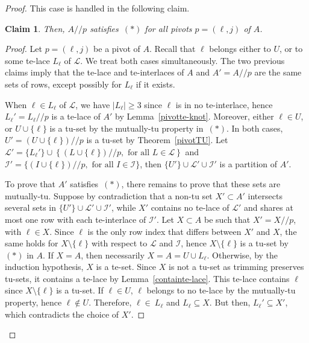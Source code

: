 \documentclass[11pt,a4paper]{amsart}
\renewcommand*{\geq}{\geqslant}
\theoremstyle{plain}
\newtheorem{claimnumb}{Claim}[theorem]{\itshape}{\rmfamily}
\theoremstyle{definition}
\newcommand{\cal}[1]{\mathcal{#1}}
\renewcommand{\cal}[1]{\mathcal{#1}}
\newcommand{\trim}{/\!\!/}
\begin{document}
\begin{proof}
\medskip

This case is handled in the following claim.

\begin{claimnumb}\label{cl1.3}
Then, $A\trim p$ satisfies~$(\ast)$ for all pivots $p=(\ell,j)$ of $A$.
\end{claimnumb}
\begin{proof}


Let $p=(\ell,j)$ be a pivot of $A$.
Recall that $\ell$ belongs either to $U$, or to some te-lace $L_\ell$ of $\cal L$. 
We treat both cases simultaneously.
The two previous claims imply that the te-lace and te-interlaces of $A$ and $A'=A\trim p$ are the same sets of rows, except possibly for $L_\ell$ if it exists.

When $\ell\in L_\ell$ of $\cal L$, we have $|L_\ell|\geq 3$ since $\ell$ is in no te-interlace, hence $L_\ell'=L_\ell\trim p$ is a te-lace of $A'$ by Lemma~\ref{pivotte-knot}.
Moreover, either $\ell\in U$, or $U\cup \{\ell\}$ is a tu-set by the mutually-tu property in~$(\ast)$.
In both cases, $U'=(U\cup \{\ell\})\trim p$ is a tu-set by Theorem~\ref{pivotTU}.
Let $\mathcal{L}'=\{L_\ell'\}\cup\left\{(L\cup \{\ell\})\trim p, \text{ for all $L\in \cal L$}\right\}$ and $\mathcal{I}'=\{(I\cup \{\ell\})\trim p, \text{ for all $I\in \cal I$}\}$, then $\{U'\}\cup \cal L' \cup \cal I'$ is a partition of $A'$.

To prove that $A'$ satisfies~$(\ast)$, there remains to prove that these sets are mutually-tu. 
Suppose by contradiction that a non-tu set $X'\subset A'$ intersects several sets in $\{U'\}\cup \cal L' \cup \cal I'$, while $X'$ contains no te-lace of $\cal L'$ and shares at most one row with each te-interlace of $\cal I'$.
Let $X\subset A$ be such that $X'=X\trim p$, with $\ell\in X$. 
Since $\ell$ is the only row index that differs between $X'$ and $X$, the same holds for $X\setminus\{\ell\}$ with respect to $\cal L$ and $\cal I$, hence $X\setminus\{\ell\}$ is a tu-set by~$(\ast)$ in $A$.
If $X=A$, then necessarily $X=A = U\cup L_\ell$.
Otherwise, by the induction hypothesis, $X$ is a te-set.
Since $X$ is not a tu-set as trimming preserves tu-sets, it contains a te-lace by Lemma~\ref{containte-lace}.
This te-lace contains $\ell$ since $X\setminus\{\ell\}$ is a tu-set.
If $\ell\in U$, $\ell$ belongs to no te-lace by the mutually-tu property, hence $\ell\notin U$.
Therefore, $\ell\in\ L_\ell$ and $L_\ell\subseteq X$.
But then, $L_\ell'\subseteq X'$, which contradicts the choice of $X'$.
\end{proof}


\end{proof}
\end{document}
